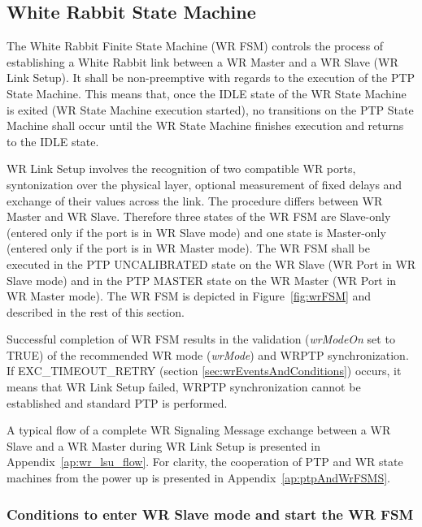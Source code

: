 \documentclass[a4paper, 12pt]{article}
\begin{document}
\newpage

\subsection{White Rabbit State Machine}
\label{wrFSM}

The White Rabbit Finite State Machine (WR FSM) controls the process of establishing a White Rabbit 
link between a WR Master and a WR Slave (WR Link Setup). It shall be non-preemptive with regards 
to the execution of the PTP State Machine. This means that, once the IDLE state of the WR State Machine is 
exited (WR State Machine execution started), no transitions on the PTP State Machine shall occur 
until the WR State Machine finishes execution and returns to the IDLE state. 

WR Link Setup involves the recognition of two 
compatible WR ports, syntonization over the physical layer, optional measurement of fixed delays and 
exchange of their values across the link. The procedure differs between WR Master and WR Slave. 
Therefore three states of the WR FSM are Slave-only (entered only if the port is in WR Slave mode) 
and one state is Master-only (entered only if the port is in WR Master mode). The WR FSM shall be 
executed in the PTP UNCALIBRATED state on the WR Slave (WR Port in WR Slave mode) and in 
the PTP MASTER state on the WR Master (WR Port in WR Master mode).
The WR FSM is depicted in Figure~\ref{fig:wrFSM} and described in the rest of this section.

Successful completion of WR FSM results in the validation (\textit{wrModeOn} set to TRUE) 
of the recommended WR mode (\textit{wrMode}) and WRPTP synchronization. If EXC\_TIMEOUT\_RETRY 
(section \ref{sec:wrEventsAndConditions}) occurs, it means that WR Link Setup failed, 
WRPTP synchronization cannot be established and standard PTP is performed.

A typical flow of a complete WR Signaling Message exchange between a WR Slave and a WR Master 
during WR Link Setup is presented in Appendix~\ref{ap:wr_lsu_flow}. For clarity, the cooperation of 
PTP and WR state machines from the power up is presented in Appendix~\ref{ap:ptpAndWrFSMS}.

\subsubsection{Conditions to enter WR Slave mode and start the WR FSM}
\label{sec:wrSlaveFSMstart}
\end{document}
